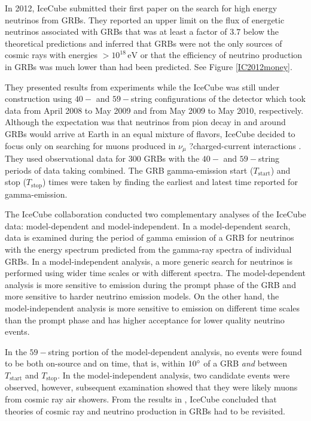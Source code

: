 \documentclass[12pt]{article}
\begin{document}
\begin{doublespace}
In 2012, IceCube submitted their first paper on the search for high energy neutrinos from GRBs. They reported an upper limit on the flux of energetic neutrinos associated with GRBs that was at least a factor of $3.7$ below the theoretical predictions and inferred that GRBs were not the only sources of cosmic rays with energies $> 10^{18} \, \mathrm{eV}$ or that the efficiency of neutrino production in GRBs was much lower than had been predicted. See Figure \ref{IC2012money}.\par
They presented results from experiments while the IceCube was still under construction using $40-$ and $59-$string configurations of the detector which took data from April 2008 to May 2009 and from May 2009 to May 2010, respectively. Although the expectation was that neutrinos from pion decay in and around GRBs would arrive at Earth in an equal mixture of flavors, IceCube decided to focus only on searching for muons produced in $\nu_\mu$ ?charged-current interactions \cite{IC2012}. They used observational data for $300$ GRBs with the $40-$ and $59-$string periods of data taking combined. The GRB gamma-emission start ($T_{\mathrm{start}}$) and stop ($T_{\mathrm{stop}}$) times were taken by finding the earliest and latest time reported for gamma-emission.\par
The IceCube collaboration conducted two complementary analyses of the IceCube data: model-dependent and model-independent. In a model-dependent search, data is examined during the period of gamma emission of a GRB for neutrinos with the energy spectrum predicted from the gamma-ray spectra of individual GRBs.
In a model-independent analysis, a more generic search for neutrinos is performed using wider time scales or with different spectra. The model-dependent analysis is more sensitive to emission during the prompt phase of the GRB and more sensitive to harder neutrino emission models. On the other hand, the model-independent analysis is more sensitive to emission on different time scales than the prompt phase and has higher acceptance for lower quality neutrino events. \par
In the $59-$string portion of the model-dependent analysis, no events were found to be both on-source and on time, that is, within $10\degree$ of a GRB \textit{and} between $T_{\mathrm{start}}$ and $T_{\mathrm{stop}}$. In the model-independent analysis, two candidate events were observed, however, subsequent examination showed that they were likely muons from cosmic ray air showers. From the results in \cite{IC2012}, IceCube concluded that theories of cosmic ray and neutrino production in GRBs had to be revisited. 


\end{doublespace}
\end{document}
